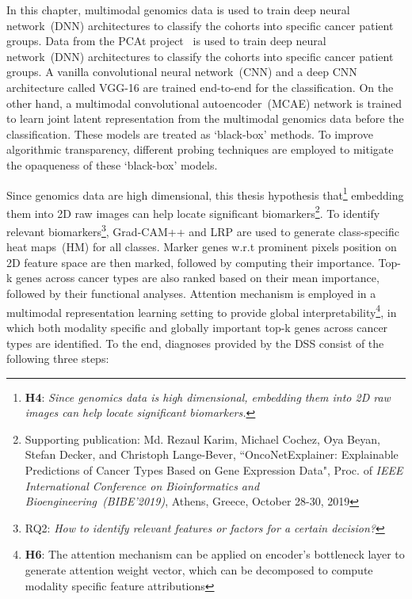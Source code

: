 \hspace*{3.5mm} In this chapter, multimodal genomics data is used to train deep neural network~(DNN) architectures to classify the cohorts into specific cancer patient groups. Data from the PCAt project~\cite{weinstein2013cancer} is used to train deep neural network~(DNN) architectures to classify the cohorts into specific cancer patient groups. A vanilla convolutional neural network~(CNN) and a deep CNN architecture called VGG-16 are trained end-to-end for the classification. On the other hand, a multimodal convolutional autoencoder~(MCAE) network is trained to learn joint latent representation from the multimodal genomics data before the classification. These models are treated as `black-box' methods. To improve algorithmic transparency, different probing techniques are employed to mitigate the opaqueness of these `black-box' models. 

\hspace*{3.5mm} Since genomics data are high dimensional, this thesis hypothesis that\footnote{\textbf{H4}: \textit{Since genomics data is high dimensional, embedding them into 2D raw images can help locate significant biomarkers.}} embedding them into 2D raw images can help locate significant biomarkers\footnote{Supporting publication: Md. Rezaul Karim, Michael Cochez, Oya Beyan, Stefan Decker, and Christoph Lange-Bever, ``OncoNetExplainer: Explainable Predictions of Cancer Types Based on Gene Expression Data", Proc. of \emph{IEEE International Conference on Bioinformatics and Bioengineering~(BIBE'2019)}, Athens, Greece, October 28-30, 2019}. %
To identify relevant biomarkers\footnote{RQ2: \textit{How to identify relevant features or factors for a certain decision?}}, Grad-CAM++ and LRP are used to generate class-specific heat maps~(HM) for all classes. 
Marker genes w.r.t prominent pixels position on 2D feature space are then marked, followed by computing their importance. Top-k genes across cancer types are also ranked based on their mean importance, followed by their functional analyses.  
Attention mechanism is employed in a multimodal representation learning setting to provide global interpretability\footnote{\textbf{H6}: The attention mechanism can be applied on encoder's bottleneck layer to generate attention weight vector, which can be decomposed to compute modality specific feature attributions}, in which both modality specific and globally important top-k genes across cancer types are identified. To the end, diagnoses provided by the DSS consist of the following three steps: 

